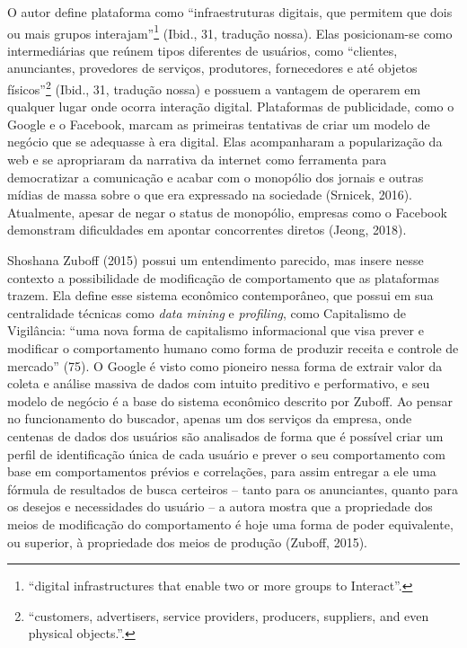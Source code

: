 O autor define plataforma como ``infraestruturas digitais, que permitem
que dois ou mais grupos interajam''\footnote{``digital infrastructures
  that enable two or more groups to Interact''.} (Ibid., 31, tradução
nossa). Elas posicionam-se como intermediárias que reúnem tipos
diferentes de usuários, como ``clientes, anunciantes, provedores de
serviços, produtores, fornecedores e até objetos físicos''\footnote{``customers,
  advertisers, service providers, producers, suppliers, and even
  physical objects.''.} (Ibid., 31, tradução nossa) e possuem a vantagem
de operarem em qualquer lugar onde ocorra interação digital. Plataformas
de publicidade, como o Google e o Facebook, marcam as primeiras
tentativas de criar um modelo de negócio que se adequasse à era digital.
Elas acompanharam a popularização da web e se apropriaram da narrativa
da internet como ferramenta para democratizar a comunicação e acabar com
o monopólio dos jornais e outras mídias de massa sobre o que era
expressado na sociedade (Srnicek, 2016). Atualmente, apesar de negar o
status de monopólio, empresas como o Facebook demonstram dificuldades em
apontar concorrentes diretos (Jeong, 2018).

Shoshana Zuboff (2015) possui um entendimento parecido, mas insere nesse
contexto a possibilidade de modificação de comportamento que as
plataformas trazem. Ela define esse sistema econômico contemporâneo, que
possui em sua centralidade técnicas como \emph{data mining} e
\emph{profiling}, como Capitalismo de Vigilância: ``uma nova forma de
capitalismo informacional que visa prever e modificar o comportamento
humano como forma de produzir receita e controle de mercado'' (75). O
Google é visto como pioneiro nessa forma de extrair valor da coleta e
análise massiva de dados com intuito preditivo e performativo, e seu
modelo de negócio é a base do sistema econômico descrito por Zuboff. Ao
pensar no funcionamento do buscador, apenas um dos serviços da empresa,
onde centenas de dados dos usuários são analisados de forma que é
possível criar um perfil de identificação única de cada usuário e prever
o seu comportamento com base em comportamentos prévios e correlações,
para assim entregar a ele uma fórmula de resultados de busca certeiros
-- tanto para os anunciantes, quanto para os desejos e necessidades do
usuário -- a autora mostra que a propriedade dos meios de modificação do
comportamento é hoje uma forma de poder equivalente, ou superior, à
propriedade dos meios de produção (Zuboff, 2015).

